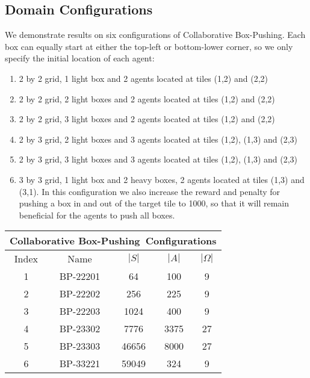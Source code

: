 \documentclass[letterpaper]{article} %
\newcommand{\cbp}[0]{Collaborative Box-Pushing}
\begin{document}
\subsection{Domain Configurations}
We demonstrate results on six configurations of \cbp. Each box can equally start at either the top-left or bottom-lower corner, so we only specify the initial location of each agent:
\begin{enumerate}
    \item 2 by 2 grid, 1 light box and 2 agents located at tiles (1,2) and (2,2)
    \item 2 by 2 grid, 2 light boxes and 2 agents located at tiles (1,2) and (2,2)
    \item 2 by 2 grid, 3 light boxes and 2 agents located at tiles (1,2) and (2,2)
    \item 2 by 3 grid, 2 light boxes and 3 agents located at tiles (1,2), (1,3) and (2,3)
    \item 2 by 3 grid, 3 light boxes and 3 agents located at tiles (1,2), (1,3) and (2,3)
    \item 3 by 3 grid, 1 light box and 2 heavy boxes, 2 agents located at tiles (1,3) and (3,1). In this configuration we also increase the reward and penalty for pushing a box in and out of the target tile to 1000, so that it will remain beneficial for the agents to push all boxes.
\end{enumerate}

\begin{center}
    \begin{tabular}{||c|c|c|c|c||}
         \hline
         \multicolumn{5}{||c||}{\cbp \ Configurations} \\
         \hline
         Index & Name & $|S|$ & $|A|$ & $|\Omega| $ \\ 
         \hline
         1 & BP-22201 & 64 & 100 & 9 \\
         \hline
         2 & BP-22202 & 256 & 225 & 9 \\
         \hline
         3 & BP-22203 & 1024 & 400 & 9 \\
         \hline
         4 & BP-23302 & 7776 & 3375 & 27 \\ 
         \hline
         5 & BP-23303 & 46656 & 8000 & 27 \\
         \hline
         6 & BP-33221 & 59049 & 324 & 9 \\
         \hline
    \end{tabular}
\end{center}
\end{document}
